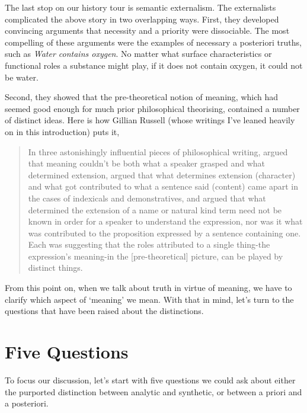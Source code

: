 The last stop on our history tour is semantic externalism. The externalists complicated the above story in two overlapping ways. First, they developed convincing arguments that necessity and a priority were dissociable. The most compelling of these arguments were the examples of necessary a posteriori truths, such as \emph{Water contains oxygen}. No matter what surface characteristics or functional roles a substance might play, if it does not contain oxygen, it could not be water. 

Second, they showed that the pre-theoretical notion of meaning, which had seemed good enough for much prior philosophical theorising, contained a number of distinct ideas. Here is how Gillian Russell (whose writings I've leaned heavily on in this introduction) puts it,

\begin{quote}

In three astonishingly influential pieces of philosophical writing, \citet{Putnam1973} argued that meaning couldn't be both what a speaker grasped and what determined extension, \citet{Kaplan1989} argued that what determines extension (character) and what got contributed to what a sentence said (content) came apart in the cases of indexicals and demonstratives, and \citet{Kripke1980} argued that what determined the extension of a name or natural kind term need not be known in order for a speaker to understand the expression, nor was it what was contributed to the proposition expressed by a sentence containing one. Each was suggesting that the roles attributed to a single thing-the expression's meaning-in the [pre-theoretical] picture, can be played by distinct things. \citep[x]{Russell2008}
\end{quote}
From this point on, when we talk about truth in virtue of meaning, we have to clarify which aspect of `meaning' we mean. With that in mind, let's turn to the questions that have been raised about the distinctions.

\section{Five Questions}
\label{fivequestions}

To focus our discussion, let's start with five questions we could ask about either the purported distinction between analytic and synthetic, or between a priori and a posteriori.

